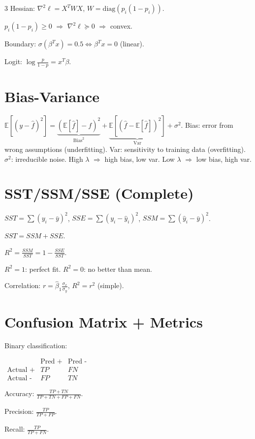 \documentclass[8pt,fleqn]{extarticle}
\begin{document}
\begin{multicols}{3}
Hessian: $\nabla^2\ell=X^TWX$, $W=\text{diag}(p_i(1-p_i))$.

$p_i(1-p_i)\ge0$ $\Rightarrow$ $\nabla^2\ell\succeq0$ $\Rightarrow$ convex.

Boundary: $\sigma(\beta^Tx)=0.5\iff\beta^Tx=0$ (linear).

Logit: $\log\frac{p}{1-p}=x^T\beta$.


\section*{Bias-Variance}
$\mathbb E[(y-\hat f)^2]=\underbrace{(\mathbb E[\hat f]-f)^2}_{\text{Bias}^2}+\underbrace{\mathbb E[(\hat f-\mathbb E[\hat f])^2]}_{\text{Var}}+\sigma^2$.
Bias: error from wrong assumptions (underfitting). Var: sensitivity to training data (overfitting). $\sigma^2$: irreducible noise. High $\lambda$ $\Rightarrow$ high bias, low var. Low $\lambda$ $\Rightarrow$ low bias, high var.

\section*{SST/SSM/SSE (Complete)}

$SST=\sum(y_i-\bar y)^2$, $SSE=\sum(y_i-\hat y_i)^2$, $SSM=\sum(\hat y_i-\bar y)^2$.

$SST=SSM+SSE$.

$R^2=\frac{SSM}{SST}=1-\frac{SSE}{SST}$.

$R^2=1$: perfect fit. $R^2=0$: no better than mean.

Correlation: $r=\hat\beta_1\frac{\sigma_x}{\sigma_y}$, $R^2=r^2$ (simple).


\section*{Confusion Matrix + Metrics}

Binary classification:

$\begin{array}{c|cc}
 & \text{Pred +} & \text{Pred -} \\
\hline
\text{Actual +} & TP & FN \\
\text{Actual -} & FP & TN
\end{array}$

Accuracy: $\frac{TP+TN}{TP+TN+FP+FN}$.

Precision: $\frac{TP}{TP+FP}$.

Recall: $\frac{TP}{TP+FN}$.


\end{multicols}
\end{document}
